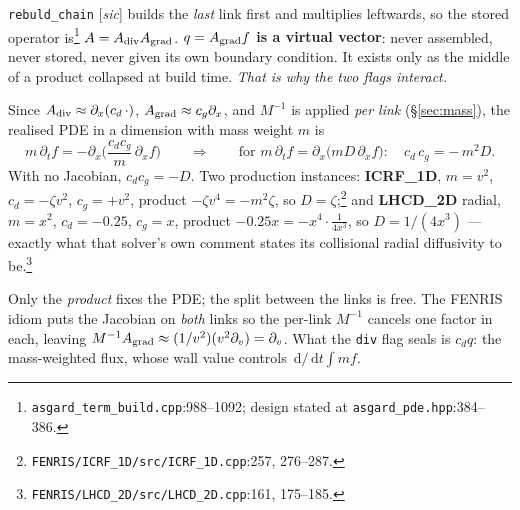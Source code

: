 \documentclass[10pt]{article}
\newcommand{\code}[1]{\texttt{#1}}
\newcommand{\dd}{\,\mathrm{d}}
\newcommand{\fl}[2]{\texttt{#1}:#2}
\begin{document}
\code{rebuld\_chain} [\emph{sic}] builds the \emph{last} link first and
multiplies leftwards, so the stored operator
is\footnote{\fl{asgard\_term\_build.cpp}{988--1092}; design stated at
\fl{asgard\_pde.hpp}{384--386}.} $A=A_{\rm div}A_{\rm grad}$. \textbf{$q=A_{\rm
grad}f$ is a virtual vector}: never assembled, never stored, never given its own
boundary condition. It exists only as the middle of a product collapsed at build
time. \emph{That is why the two flags interact.}

Since $A_{\rm div}\approx\partial_x(c_d\,\cdot)$, $A_{\rm grad}\approx
c_g\partial_x$, and $M^{-1}$ is applied \emph{per link} (\S\ref{sec:mass}), the
realised PDE in a dimension with mass weight $m$ is
\begin{equation}
\boxed{\;
  m\,\partial_t f = -\partial_x\!\Big(\frac{c_d c_g}{m}\,\partial_x f\Big)
  \qquad\Longrightarrow\qquad
  \text{for } m\,\partial_t f = \partial_x\big(mD\,\partial_x f\big):\quad
  c_d\,c_g = -\,m^2 D .\;}
\label{eq:coef}
\end{equation}
With no Jacobian, $c_dc_g=-D$. Two production instances: \textbf{ICRF\_1D},
$m=v^2$, $c_d=-\zeta v^2$, $c_g=+v^2$, product $-\zeta v^4=-m^2\zeta$, so
$D=\zeta$;\footnote{\code{FENRIS/ICRF\_1D/src/ICRF\_1D.cpp}:257, 276--287.} and
\textbf{LHCD\_2D} radial, $m=x^2$, $c_d=-0.25$, $c_g=x$, product
$-0.25x=-x^4\cdot\frac{1}{4x^3}$, so $D=1/(4x^3)$ --- exactly what that solver's
own comment states its collisional radial diffusivity to
be.\footnote{\code{FENRIS/LHCD\_2D/src/LHCD\_2D.cpp}:161, 175--185.}

Only the \emph{product} fixes the PDE; the split between the links is free. The
FENRIS idiom puts the Jacobian on \emph{both} links so the per-link $M^{-1}$
cancels one factor in each, leaving $M^{-1}A_{\rm
grad}\approx(1/v^2)(v^2\partial_v)=\partial_v$. What the \code{div} flag seals is
$c_dq$: the mass-weighted flux, whose wall value controls $\dd/\dd t\int mf$.
\end{document}
